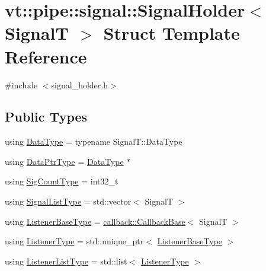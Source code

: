 \hypertarget{structvt_1_1pipe_1_1signal_1_1_signal_holder}{}\section{vt\+:\+:pipe\+:\+:signal\+:\+:Signal\+Holder$<$ SignalT $>$ Struct Template Reference}
\label{structvt_1_1pipe_1_1signal_1_1_signal_holder}


{\ttfamily \#include $<$signal\+\_\+holder.\+h$>$}

\subsection*{Public Types}
\begin{DoxyCompactItemize}
\item 
using \hyperlink{structvt_1_1pipe_1_1signal_1_1_signal_holder_a4c1ad2d2a961f4d381d9c9455bc0d901}{Data\+Type} = typename Signal\+T\+::\+Data\+Type
\item 
using \hyperlink{structvt_1_1pipe_1_1signal_1_1_signal_holder_aad5bfc2b46dfa071ae638385324d7e31}{Data\+Ptr\+Type} = \hyperlink{structvt_1_1pipe_1_1signal_1_1_signal_holder_a4c1ad2d2a961f4d381d9c9455bc0d901}{Data\+Type} $\ast$
\item 
using \hyperlink{structvt_1_1pipe_1_1signal_1_1_signal_holder_aced54515f402b63f6dea174e5b027c81}{Sig\+Count\+Type} = int32\+\_\+t
\item 
using \hyperlink{structvt_1_1pipe_1_1signal_1_1_signal_holder_ab04d27c1c48b28813fdd8af29a4cda92}{Signal\+List\+Type} = std\+::vector$<$ SignalT $>$
\item 
using \hyperlink{structvt_1_1pipe_1_1signal_1_1_signal_holder_a84b564235f6d400782769c94a75d6622}{Listener\+Base\+Type} = \hyperlink{structvt_1_1pipe_1_1callback_1_1_callback_base}{callback\+::\+Callback\+Base}$<$ SignalT $>$
\item 
using \hyperlink{structvt_1_1pipe_1_1signal_1_1_signal_holder_a23af418129e6e8ecb4ee9621e6fd6f90}{Listener\+Type} = std\+::unique\+\_\+ptr$<$ \hyperlink{structvt_1_1pipe_1_1signal_1_1_signal_holder_a84b564235f6d400782769c94a75d6622}{Listener\+Base\+Type} $>$
\item 
using \hyperlink{structvt_1_1pipe_1_1signal_1_1_signal_holder_ae37fd15e6a901de2f90620780e936f6e}{Listener\+List\+Type} = std\+::list$<$ \hyperlink{structvt_1_1pipe_1_1signal_1_1_signal_holder_a23af418129e6e8ecb4ee9621e6fd6f90}{Listener\+Type} $>$
\item 

\end{DoxyCompactItemize}
